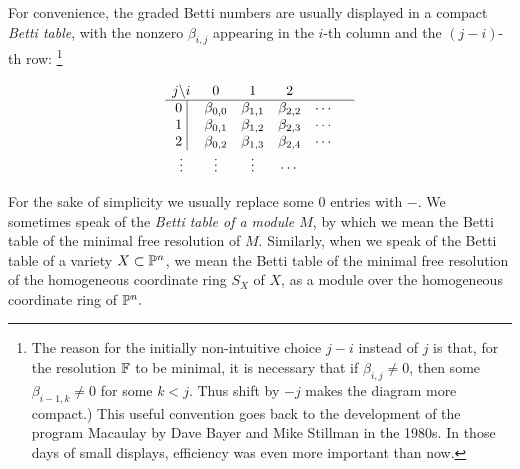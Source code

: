 For convenience, the graded Betti numbers are usually displayed in a compact \emph{Betti table}, with the nonzero $\beta_{i,j}$ appearing in the $i$-th column and the $(j-i)$-th row: \footnote{The reason for the initially non-intuitive choice $j-i$ instead of $j$ is that, for the resolution ${\mathbb F}$ to be minimal, it is necessary that if $\beta_{i,j}\neq 0$, then some $\beta_{i-1,k}\neq 0$ for some $k<j$. Thus shift by $-j$ makes the diagram more compact.) This useful convention goes back to the development of the program Macaulay by Dave Bayer and Mike Stillman  in the 1980s. In those days of small displays, efficiency was even more important than now.}
\setcounter{MaxMatrixCols}{13}
\begin{small}
$$
\begin{matrix}
j \backslash i     &0&1&2\\ \hline
\text{0 }\vline &\gb_{0,0}&\gb_{1,1}&\gb_{2,2}&\cdots&\\
\text{1 }\vline &\gb_{0,1}&\gb_{1,2}&\gb_{2,3}&\cdots&\\
\text{2 }\vline &\gb_{0,2}&\gb_{1,3}&\gb_{2,4}&\cdots&\\
\vdots&\vdots&\vdots&\cdots&\\
\end{matrix}
$$
\end{small}
\noindent For the sake of simplicity we usually replace some 0 entries with $-$.
We sometimes speak of the \emph{Betti table of a module $M$}, by which we mean the Betti table of the minimal free resolution
of $M$. Similarly, when we speak of the Betti table of a variety $X\subset {\mathbb P}^{n}$, we mean the Betti table of the minimal free resolution
of the homogeneous coordinate ring $S_{X}$ of $X$, as a module over the homogeneous coordinate ring of ${\mathbb P}^{n}.$ 

